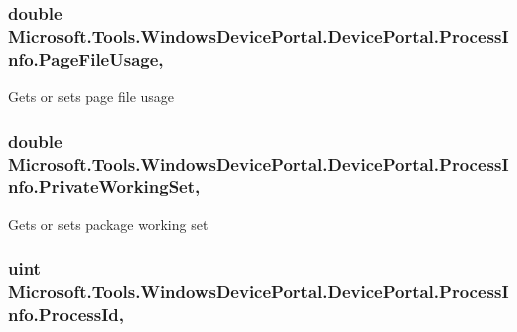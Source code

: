 \subsubsection[{\texorpdfstring{Page\+File\+Usage}{PageFileUsage}}]{\setlength{\rightskip}{0pt plus 5cm}double Microsoft.\+Tools.\+Windows\+Device\+Portal.\+Device\+Portal.\+Process\+Info.\+Page\+File\+Usage\hspace{0.3cm}{\ttfamily [get]}, {\ttfamily [set]}}\hypertarget{class_microsoft_1_1_tools_1_1_windows_device_portal_1_1_device_portal_1_1_process_info_a21c01a77fdbb3ec55f50f699f1038042}{}\label{class_microsoft_1_1_tools_1_1_windows_device_portal_1_1_device_portal_1_1_process_info_a21c01a77fdbb3ec55f50f699f1038042}


Gets or sets page file usage 

\subsubsection[{\texorpdfstring{Private\+Working\+Set}{PrivateWorkingSet}}]{\setlength{\rightskip}{0pt plus 5cm}double Microsoft.\+Tools.\+Windows\+Device\+Portal.\+Device\+Portal.\+Process\+Info.\+Private\+Working\+Set\hspace{0.3cm}{\ttfamily [get]}, {\ttfamily [set]}}\hypertarget{class_microsoft_1_1_tools_1_1_windows_device_portal_1_1_device_portal_1_1_process_info_a0ed6e401e5213f691b332fdaf1caeff8}{}\label{class_microsoft_1_1_tools_1_1_windows_device_portal_1_1_device_portal_1_1_process_info_a0ed6e401e5213f691b332fdaf1caeff8}


Gets or sets package working set 

\subsubsection[{\texorpdfstring{Process\+Id}{ProcessId}}]{\setlength{\rightskip}{0pt plus 5cm}uint Microsoft.\+Tools.\+Windows\+Device\+Portal.\+Device\+Portal.\+Process\+Info.\+Process\+Id\hspace{0.3cm}{\ttfamily [get]}, {\ttfamily [set]}}\hypertarget{class_microsoft_1_1_tools_1_1_windows_device_portal_1_1_device_portal_1_1_process_info_a43309d13a583cf63dd0880a73c03e63c}{}\label{class_microsoft_1_1_tools_1_1_windows_device_portal_1_1_device_portal_1_1_process_info_a43309d13a583cf63dd0880a73c03e63c}


